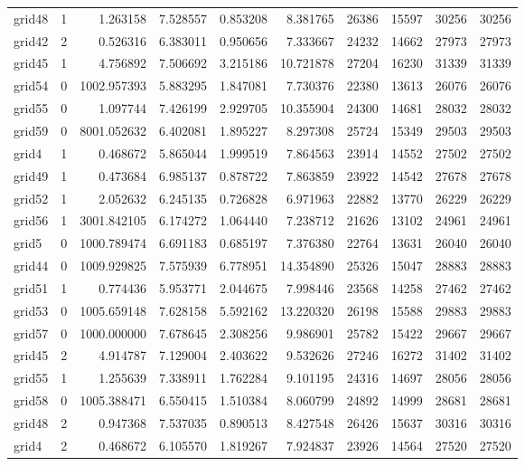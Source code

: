 \begin{longtable}{|l|r|r|r|r|r|r|r|r|r|}
grid48 & 1 & 1.263158 & 7.528557 & 0.853208 & 8.381765 & 26386 & 15597 & 30256 & 30256 \\
grid42 & 2 & 0.526316 & 6.383011 & 0.950656 & 7.333667 & 24232 & 14662 & 27973 & 27973 \\
grid45 & 1 & 4.756892 & 7.506692 & 3.215186 & 10.721878 & 27204 & 16230 & 31339 & 31339 \\
grid54 & 0 & 1002.957393 & 5.883295 & 1.847081 & 7.730376 & 22380 & 13613 & 26076 & 26076 \\
grid55 & 0 & 1.097744 & 7.426199 & 2.929705 & 10.355904 & 24300 & 14681 & 28032 & 28032 \\
grid59 & 0 & 8001.052632 & 6.402081 & 1.895227 & 8.297308 & 25724 & 15349 & 29503 & 29503 \\
grid4 & 1 & 0.468672 & 5.865044 & 1.999519 & 7.864563 & 23914 & 14552 & 27502 & 27502 \\
grid49 & 1 & 0.473684 & 6.985137 & 0.878722 & 7.863859 & 23922 & 14542 & 27678 & 27678 \\
grid52 & 1 & 2.052632 & 6.245135 & 0.726828 & 6.971963 & 22882 & 13770 & 26229 & 26229 \\
grid56 & 1 & 3001.842105 & 6.174272 & 1.064440 & 7.238712 & 21626 & 13102 & 24961 & 24961 \\
grid5 & 0 & 1000.789474 & 6.691183 & 0.685197 & 7.376380 & 22764 & 13631 & 26040 & 26040 \\
grid44 & 0 & 1009.929825 & 7.575939 & 6.778951 & 14.354890 & 25326 & 15047 & 28883 & 28883 \\
grid51 & 1 & 0.774436 & 5.953771 & 2.044675 & 7.998446 & 23568 & 14258 & 27462 & 27462 \\
grid53 & 0 & 1005.659148 & 7.628158 & 5.592162 & 13.220320 & 26198 & 15588 & 29883 & 29883 \\
grid57 & 0 & 1000.000000 & 7.678645 & 2.308256 & 9.986901 & 25782 & 15422 & 29667 & 29667 \\
grid45 & 2 & 4.914787 & 7.129004 & 2.403622 & 9.532626 & 27246 & 16272 & 31402 & 31402 \\
grid55 & 1 & 1.255639 & 7.338911 & 1.762284 & 9.101195 & 24316 & 14697 & 28056 & 28056 \\
grid58 & 0 & 1005.388471 & 6.550415 & 1.510384 & 8.060799 & 24892 & 14999 & 28681 & 28681 \\
grid48 & 2 & 0.947368 & 7.537035 & 0.890513 & 8.427548 & 26426 & 15637 & 30316 & 30316 \\
grid4 & 2 & 0.468672 & 6.105570 & 1.819267 & 7.924837 & 23926 & 14564 & 27520 & 27520 \\

\end{longtable}
